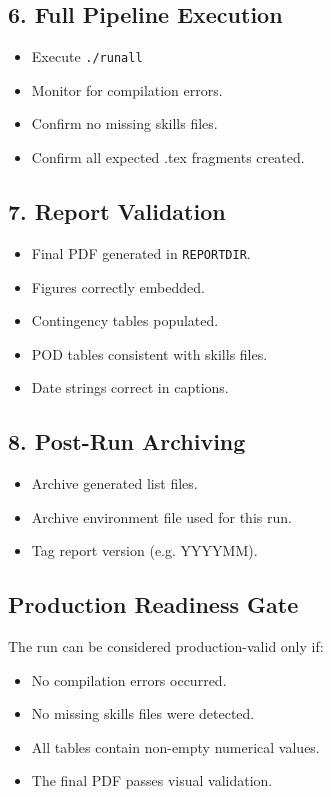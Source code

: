 \documentclass[a4paper,11pt]{article}
\begin{document}
\subsection{6. Full Pipeline Execution}

\begin{itemize}
    \item [ ] Execute \texttt{./runall}
    \item [ ] Monitor for compilation errors.
    \item [ ] Confirm no missing skills files.
    \item [ ] Confirm all expected .tex fragments created.
\end{itemize}

\subsection{7. Report Validation}

\begin{itemize}
    \item [ ] Final PDF generated in \texttt{REPORTDIR}.
    \item [ ] Figures correctly embedded.
    \item [ ] Contingency tables populated.
    \item [ ] POD tables consistent with skills files.
    \item [ ] Date strings correct in captions.
\end{itemize}

\subsection{8. Post-Run Archiving}

\begin{itemize}
    \item [ ] Archive generated list files.
    \item [ ] Archive environment file used for this run.
    \item [ ] Tag report version (e.g. YYYYMM).
\end{itemize}

\subsection{Production Readiness Gate}

The run can be considered production-valid only if:

\begin{itemize}
    \item No compilation errors occurred.
    \item No missing skills files were detected.
    \item All tables contain non-empty numerical values.
    \item The final PDF passes visual validation.
\end{itemize}
\end{document}
